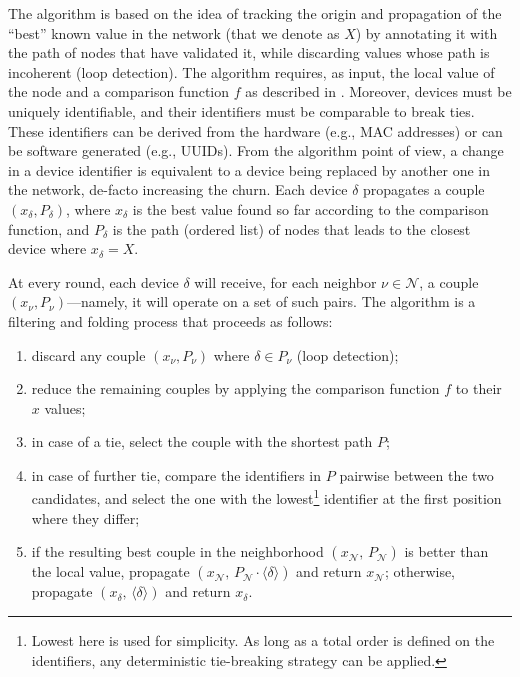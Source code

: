 \documentclass[runningheads]{llncs}
\newcommand{\seq}[1]{\langle #1 \rangle}      %
\begin{document}
The algorithm is based on the idea of tracking the origin and propagation of the ``best''
known value in the network (that we denote as $X$) by annotating it with the path of nodes that have validated it,
while discarding values whose path is incoherent (loop detection).
%
The algorithm requires, as input,
the local value of the node and a comparison function $f$ as described in .
%
Moreover, devices must be uniquely identifiable,
and their identifiers must be comparable to break ties.
%
These identifiers can be derived from the hardware (e.g., \ac{MAC} addresses)
or can be software generated (e.g., \acp{UUID}).
%
From the algorithm point of view, a change in a device identifier is equivalent to a device being replaced
by another one in the network, de-facto increasing the churn.
%
Each device $\delta$ propagates a couple $(x_\delta, P_\delta)$,
where $x_\delta$ is the best value found so far according to the comparison function,
and $P_\delta$ is the path (ordered list) of nodes that leads to the closest device where $x_\delta = X$.

At every round,
each device $\delta$ will receive, for each neighbor $\nu \in \mathcal{N}$, a couple $(x_\nu, P_\nu)$---namely,
it will operate on a set of such pairs.
%
The algorithm is a filtering and folding process that proceeds as follows:
\begin{enumerate}
    \item discard any couple $(x_\nu, P_\nu)$ where $\delta \in P_\nu$ (loop detection);
    \item reduce the remaining couples by applying the comparison function $f$ to their $x$ values;
    \item in case of a tie, select the couple with the shortest path $P$;
    \item in case of further tie,
    compare the identifiers in $P$ pairwise between the two candidates,
    and select the one with the lowest\footnote{
        Lowest here is used for simplicity.
        As long as a total order is defined on the identifiers,
        any deterministic tie-breaking strategy can be applied.
    } identifier at the first position where they differ;
    \item if the resulting best couple in the neighborhood $(x_{\mathcal N},\, P_{\mathcal N})$
    is better than the local value,
    propagate $(x_{\mathcal N},\, P_{\mathcal N} \cdot \seq{\delta})$ and return $x_{\mathcal N}$;
    otherwise, propagate $(x_\delta,\, \seq{\delta})$ and return $x_\delta$.
\end{enumerate}
\end{document}
